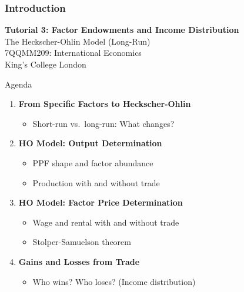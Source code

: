 \documentclass{beamer}
\begin{document}
\subsubsection{Introduction}

\begin{frame}

\vspace{1.5cm}

\centering
{\Large \textbf{Tutorial 3: Factor Endowments and Income Distribution}} \\[0.5cm]
{\large The Heckscher-Ohlin Model (Long-Run)} \\[1.0cm]

{\small 7QQMM209: International Economics} \\[0.3cm]
{\small King's College London}

\vfill

\end{frame}


\begin{frame}{Agenda}

\begin{enumerate}
    \item \textbf{From Specific Factors to Heckscher-Ohlin}
    \begin{itemize}
        \item Short-run vs.\ long-run: What changes?
    \end{itemize}
    
    \vspace{0.3cm}
    
    \item \textbf{HO Model: Output Determination}
    \begin{itemize}
        \item PPF shape and factor abundance
        \item Production with and without trade
    \end{itemize}
    
    \vspace{0.3cm}
    
    \item \textbf{HO Model: Factor Price Determination}
    \begin{itemize}
        \item Wage and rental with and without trade
        \item Stolper-Samuelson theorem
    \end{itemize}
    
    \vspace{0.3cm}
    
    \item \textbf{Gains and Losses from Trade}
    \begin{itemize}
        \item Who wins? Who loses? (Income distribution)
    \end{itemize}
\end{enumerate}

\end{frame}
\end{document}
